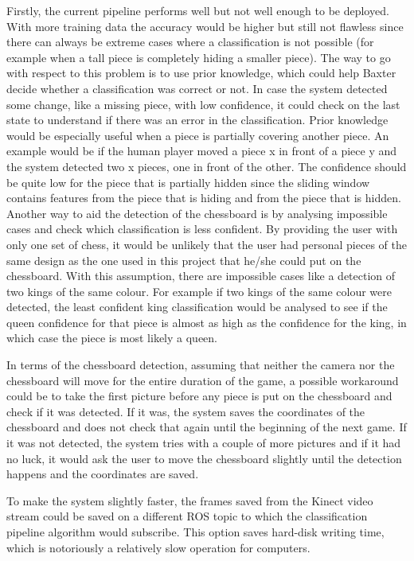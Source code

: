 \documentclass{l4proj}
\begin{document}
Firstly, the current pipeline performs well but not well enough to be deployed. With more training data the accuracy would be higher but still not flawless since there can always be extreme cases where a classification is not possible (for example when a tall piece is completely hiding a smaller piece). The way to go with respect to this problem is to use prior knowledge, which could help Baxter decide whether a classification was correct or not. In case the system detected some change, like a missing piece, with low confidence, it could check on the last state to understand if there was an error in the classification. Prior knowledge would be especially useful when a piece is partially covering another piece. An example would be if the human player moved a piece x in front of a piece y and the system detected two x pieces, one in front of the other. The confidence should be quite low for the piece that is partially hidden since the sliding window contains features from the piece that is hiding and from the piece that is hidden.
Another way to aid the detection of the chessboard is by analysing impossible cases and check which classification is less confident. By providing the user with only one set of chess, it would be unlikely that the user had personal pieces of the same design as the one used in this project that he/she could put on the chessboard. With this assumption, there are impossible cases like a detection of two kings of the same colour. For example if two kings of the same colour were detected, the least confident king classification would be analysed to see if the queen confidence for that piece is almost as high as the confidence for the king, in which case the piece is most likely a queen.

In terms of the chessboard detection, assuming that neither the camera nor the chessboard will move for the entire duration of the game, a possible workaround could be to take the first picture before any piece is put on the chessboard and check if it was detected. If it was, the system saves the coordinates of the chessboard and does not check that again until the beginning of the next game. If it was not detected, the system tries with a couple of more pictures and if it had no luck, it would ask the user to move the chessboard slightly until the detection happens and the coordinates are saved.

To make the system slightly faster, the frames saved from the Kinect video stream could be saved on a different ROS topic to which the classification pipeline algorithm would subscribe. This option saves hard-disk writing time, which is notoriously a relatively slow operation for computers.
\end{document}
